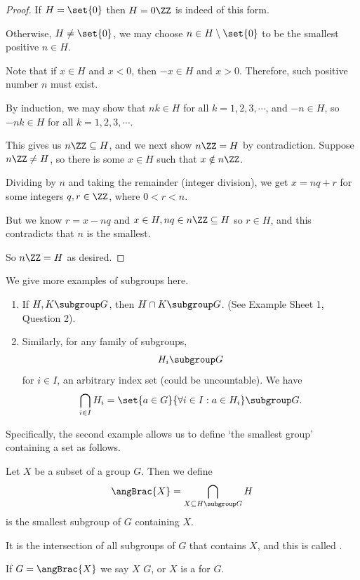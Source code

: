 \begin{proof}
    If \(H = \set{0}\) then \(H = 0\ZZ\) is indeed of this form.

    Otherwise, \(H \neq \set{0}\), we may choose \(n \in H \setminus \set{0}\) to be the smallest positive \(n \in H\).

    Note that if \(x \in H\) and \(x < 0\), then \(-x \in H\) and \(x > 0\). Therefore, such positive number \(n\) must exist.

    By induction, we may show that \(nk \in H\) for all \(k = 1, 2, 3, \cdots\), and \(-n \in H\), so \(-nk \in H\) for all \(k = 1, 2, 3, \cdots\).

    This gives us \(n\ZZ \subseteq H\), and we next show \(n\ZZ = H\) by contradiction. Suppose \(n \ZZ \neq H\), so there is some \(x \in H\) such that \(x \notin n\ZZ\).

    Dividing by \(n\) and taking the remainder (integer division), we get \(x = nq + r\) for some integers \(q, r \in \ZZ\), where \(0 < r < n\).

    But we know \(r = x - nq\) and \(x \in H, nq \in n\ZZ \subseteq H\) so \(r \in H\), and this contradicts that \(n\) is the smallest.

    So \(n\ZZ = H\) as desired.
\end{proof}

We give more examples of subgroups here.

\begin{examples*}
    \begin{enumerate}
        \item If \(H, K \subgroup G\), then \(H \cap K \subgroup G\). (See Example Sheet 1, Question 2).
        \item Similarly, for any family of subgroups,
        \[
            H_i \subgroup G
        \]
        for \(i \in I\), an arbitrary index set (could be uncountable). We have
        \[
            \bigcap_{i \in I} H_i = \set{a \in G}{\forall i \in I: a \in H_i} \subgroup G.
        \]
    \end{enumerate}
\end{examples*}

Specifically, the second example allows us to define `the smallest group' containing a set as follows.

\begin{definition}
    \label{def:generating-set}%
    Let \(X\) be a subset of a group \(G\). Then we define
    \[
        \angBrac{X} = \bigcap_{X \subseteq H \subgroup G} H
    \]
    is the smallest subgroup of \(G\) containing \(X\).

    It is the intersection of all subgroups of \(G\) that contains \(X\), and this is called .

    If \(G = \angBrac{X}\) we say \(X\)  \(G\), or \(X\) is a  for \(G\).
\end{definition}

